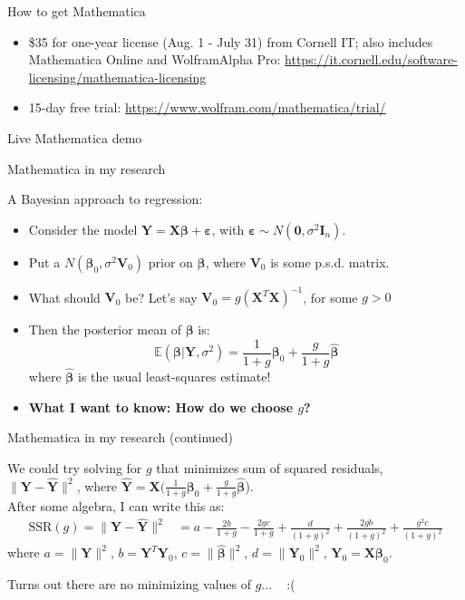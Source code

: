 \documentclass[dvipsnames, handout]{beamer}
\let\b\mathbf
\let\bg\boldsymbol
\newcommand{\E}{\mathbb{E}}	%
\newcommand{\1}{\mathds{1}}	%
\begin{document}
\begin{frame}{How to get Mathematica}
\begin{itemize}
\item \$35 for one-year license (Aug. 1 - July 31) from Cornell IT; also includes Mathematica Online and WolframAlpha Pro: {\color{RoyalBlue}\url{https://it.cornell.edu/software-licensing/mathematica-licensing}}\\[1em]
\item 15-day free trial: {\color{RoyalBlue}\url{https://www.wolfram.com/mathematica/trial/}}
\end{itemize}
\end{frame}

\begin{frame}
\begin{center}\Large\color{titleText}Live Mathematica demo\end{center}	
\end{frame}

\begin{frame}{Mathematica in my research}

{\small A Bayesian approach to regression:
\begin{itemize}
\item Consider the model $\b Y = \b X\bg\beta + \bg\varepsilon$, with $\bg\varepsilon \sim N(\b 0,\sigma^2 \b I_n)$. 
\item Put a $N(\bg\beta_0,\sigma^2\b V_0)$ prior on $\bg\beta$, where $\b V_0$ is some p.s.d. matrix.
\item What should $\b V_0$ be? Let's say $\b V_0 = g(\b X^T \b X)^{-1}$, for some $g>0$
\item Then the posterior mean of $\bg\beta$ is:
$$\E(\bg\beta|\b Y,\sigma^2) = \frac{1}{1+g}\bg\beta_0 + \frac{g}{1+g}\bg{\hat\beta}$$
where $\bg{\hat\beta}$ is the usual least-squares estimate!
\item \textbf{What I want to know: How do we choose $g$?}
\end{itemize}}
\end{frame}

\begin{frame}{Mathematica in my research (continued)}

{\small We could try solving for $g$ that minimizes sum of squared residuals,\\[.5em] $\|\b Y - \b{\hat Y}\|^2$, where $\b{\hat Y} = \b X(\frac{1}{1+g}\bg\beta_0+\frac{g}{1+g}\bg{\hat\beta}$).\\[1em]

After some algebra, I can write this as:
{\scriptsize\begin{align*}
\text{SSR}(g)=\|\b Y - \b{\hat Y}\|^2 &= a-\frac{2b}{1+g}-\frac{2gc}{1+g}+\frac{d}{(1+g)^2}+\frac{2gb}{(1+g)^2}+\frac{g^2c}{(1+g)^2}
\end{align*}}
where $a=\|\b Y\|^2$, $b=\b Y^T\b Y_0$, $c=\|\bg{\hat\beta}\|^2$, $d=\|\b Y_0\|^2$, $\b Y_0 = \b X\bg\beta_0$.
\begin{figure}[H]
\centering{}	
\end{figure}
Turns out there are no minimizing values of $g$... ~ :(
}
\end{frame}
\end{document}
